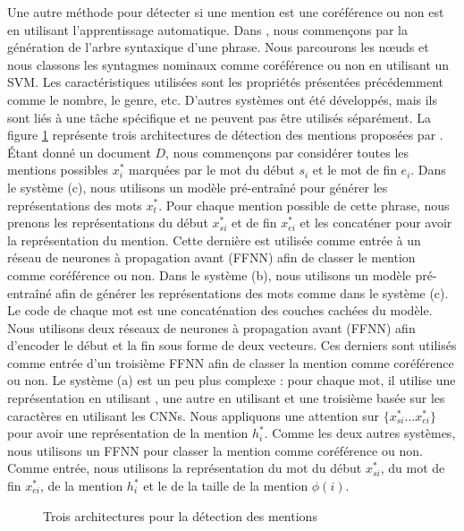 \documentclass{KodeBook}
\begin{document}
Une autre méthode pour détecter si une mention est une coréférence ou non est en utilisant l'apprentissage automatique. 
Dans \cite{2013-uryupina-moschitti}, nous commençons par la génération de l'arbre syntaxique d'une phrase. 
Nous parcourons les nœuds et nous classons les syntagmes nominaux comme coréférence ou non en utilisant un SVM. 
Les caractéristiques utilisées sont les propriétés présentées précédemment comme le nombre, le genre, etc.
D'autres systèmes ont été développés, mais ils sont liés à une tâche spécifique et ne peuvent pas être utilisés séparément. 
La figure \ref{fig:det-mention-yu} représente trois architectures de détection des mentions proposées par \citet{2020-yu-al}. 
Étant donné un document $D$, nous commençons par considérer toutes les mentions possibles $x^*_i$ marquées par le mot du début $s_i$ et le mot de fin $e_i$. 
Dans le système (c), nous utilisons un modèle  pré-entraîné pour générer les représentations des mots $x^*_t$. 
Pour chaque mention possible de cette phrase, nous prenons les représentations du début $x^*_{si}$ et de fin $x^*_{ei}$ et les concaténer pour avoir la représentation du mention. 
Cette dernière est utilisée comme entrée à un réseau de neurones à propagation avant (FFNN) afin de classer le mention comme coréférence ou non. 
Dans le système (b), nous utilisons un modèle  pré-entraîné afin de générer les représentations des mots comme dans le système (c). 
Le code de chaque mot est une concaténation des couches cachées du modèle.
Nous utilisons deux réseaux de neurones à propagation avant (FFNN) afin d'encoder le début et la fin sous forme de deux vecteurs. 
Ces derniers sont utilisés comme entrée d'un troisième FFNN afin de classer la mention comme coréférence ou non. 
Le système (a) est un peu plus complexe : pour chaque mot, il utilise une représentation en utilisant , une autre en utilisant  et une troisième basée sur les caractères en utilisant les CNNs. 
Nous appliquons une attention sur $\{x^*_{si}\ldots x^*_{ei}\}$ pour avoir une représentation de la mention $h^*_i$. 
Comme les deux autres systèmes, nous utilisons un FFNN pour classer la mention comme coréférence ou non. 
Comme entrée, nous utilisons la représentation du mot du début $x^*_{si}$, du mot de fin $x^*_{ei}$, de la mention $h^*_i$ et le  de la taille de la mention $\phi(i)$.
\begin{figure}[ht]
	\centering
	\caption[Trois architectures pour la détection des mentions]{Trois architectures pour la détection des mentions \cite{2020-yu-al}}
	\label{fig:det-mention-yu}
\end{figure}
\end{document}
